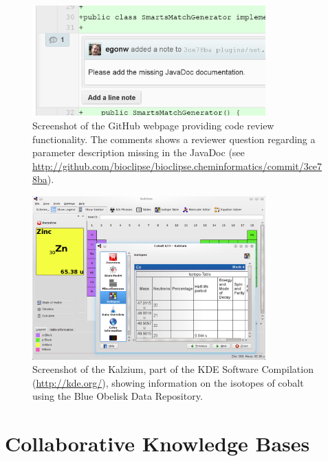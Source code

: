 \documentclass[11pt]{book}
\begin{document}
\begin{figure}[bt]
\begin{center}
\includegraphics[width=0.8\textwidth]{graphics/codeReview8.png}
\end{center}
\caption{Screenshot of the GitHub webpage providing code
review functionality. The comments shows a reviewer question
regarding a parameter description missing in the JavaDoc
(see \url{http://github.com/bioclipse/bioclipse.cheminformatics/commit/3ce78ba}).}
\label{fig:githubCodereview}
\end{figure}

\begin{figure}[bt]
\begin{center}
\includegraphics[width=0.8\textwidth]{graphics/kalzium.png}
\end{center}
\caption{Screenshot of the Kalzium, part of the KDE Software
Compilation (\url{http://kde.org/}), showing information on the
isotopes of cobalt using the Blue Obelisk Data Repository.}
\label{fig:kalzium}
\end{figure}

\section{Collaborative Knowledge Bases}
\end{document}
